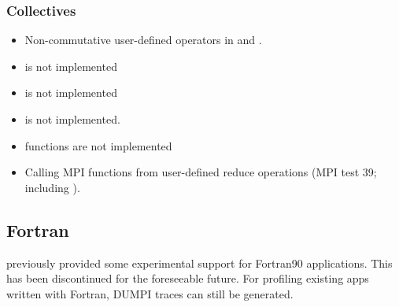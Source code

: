 \subsubsection{Collectives}
\label{subsubsec:issues:mpi:collectives}

\begin{itemize}
\item Non-commutative user-defined operators in  and .
\item {} is not implemented
\item {} is not implemented
\item {} is not implemented.
\item {} functions are not implemented 
\item Calling MPI functions from user-defined reduce operations (MPI test 39; including ).
\end{itemize}


\subsection{Fortran}
\label{subsec:issues:fortran}

\sstmacro previously provided some experimental support for Fortran90 applications. 
This has been discontinued for the foreseeable future.
For profiling existing apps written with Fortran, DUMPI traces can still be generated. 

